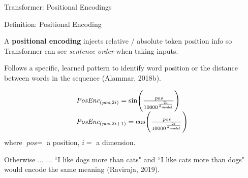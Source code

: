 \begin{frame}{Transformer: Positional Encodings}
    
    \vspace{10pt}
    
    \begin{definitionBlock}{Definition: Positional Encoding}
        \footnotesize 
        
        A \alert{\textbf{positional encoding}} injects relative / absolute token position info so Transformer can see \emph{sentence order} when taking inputs.\newline 
        
        Follows a specific, learned pattern to identify word position or the distance between words in the sequence (Alammar, 2018b). 
        
        $$
        \begin{array}{ll}
        \textit{PosEnc}_{\Large (\textit{pos}, 2i)} = \text{sin} \Bigg(\frac {\textit{pos}} {10000^{\Large \frac {2i} {d_{\textit{model}}} } }  \Bigg) \\
        \textit{PosEnc}_{\Large (\textit{pos}, 2i + 1)} = \text{cos} \Bigg(\frac {\textit{pos}} {10000^{\Large \frac {2i} {d_{\textit{model}}} } }  \Bigg)
        \end{array}
        $$
        where $\textit{pos} = $ a position, $i = $ a dimension.
    \end{definitionBlock}
    
    
    \vspace{-5pt}
    \begin{alertBlock}{Otherwise ...}
    ... ``I like dogs more than cats" and ``I like cats more than dogs" would encode the same meaning (Raviraja, 2019). 
    \end{alertBlock}
    
    
\end{frame}



